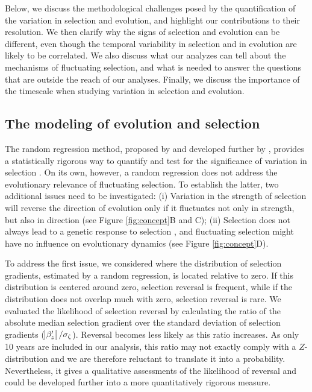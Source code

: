 Below, we discuss the methodological challenges posed by the quantification of the variation in selection and evolution, and highlight our contributions to their resolution. We then clarify why the signs of selection and evolution can be different, even though the temporal variability in selection and in evolution are likely to be correlated. We also discuss what our analyzes can tell about the mechanisms of fluctuating selection, and what is needed to answer the questions that are outside the reach of our analyses. 
Finally, we discuss the importance of the timescale when studying variation in selection and evolution.

\subsection*{The modeling of evolution and selection}
The random regression method, proposed by \cite{Morrissey2012flusel} and developed further by \cite{Chevin2015b}, provides a statistically rigorous way to quantify and test for the significance of variation in selection \parencite{Chevin2015b}. On its own, however, a random regression does not address the evolutionary relevance of fluctuating selection. To establish the latter, two additional issues need to be investigated: (i) Variation in the strength of selection will reverse the direction of evolution only if it fluctuates not only in strength, but also in direction (see Figure \ref{fig:concept}B and C); (ii) Selection does not always lead to a genetic response to selection \parencite{Rausher1992, Morrissey2010, Merila2001}, and fluctuating selection might have no influence on evolutionary dynamics (see Figure \ref{fig:concept}D).

To address the first issue, we considered where the distribution of selection gradients, estimated by a random regression, is located relative to zero. If this distribution is centered around zero, selection reversal is frequent, while if the distribution does not overlap much with zero, selection reversal is rare.
We evaluated the likelihood of selection reversal by calculating the ratio of the absolute median selection gradient over the standard deviation of selection gradients ($\abs{\beta_{z}^\prime}/\sigma_\zeta$). Reversal becomes less likely as this ratio increases.
As only 10 years are included in our analysis, this ratio may not exactly comply with a $Z$-distribution and we are therefore reluctant to translate it into a probability. Nevertheless, it gives a qualitative assessments of the likelihood of reversal and could be developed further into a more quantitatively rigorous measure.

